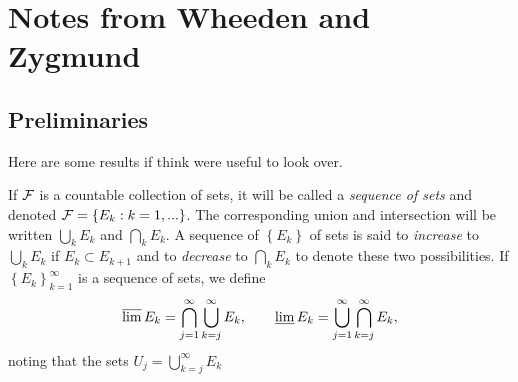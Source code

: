 \chapter{Notes from Wheeden and Zygmund}
\section{Preliminaries}
Here are some results if think were useful to look over.

If $\mathcal{F}$ is a countable collection of sets, it will be called a
\emph{sequence of sets} and denoted $\mathcal{F}=\left\{E_k:k=1,...\right\}$. The
corresponding union and intersection will be written $\bigcup_k E_k$ and
$\bigcap_k E_k$. A sequence of $\left\{E_k\right\}$ of sets is said to
\emph{increase} to $\bigcup_k E_k$ if $E_k\subset E_{k+1}$ and to
\emph{decrease} to $\bigcap_k E_k$ to denote these two possibilities. If
$\left\{E_k\right\}_{k=1}^\infty$ is a sequence of sets, we define
\begin{equation}
  \label{eq:liminf-limsup-sets}
\varlimsup E_k=\bigcap_{j=1}^\infty\bigcup_{k=j}^\infty E_k,\qquad
\varliminf E_k=\bigcup_{j=1}^\infty\bigcap_{k=j}^\infty E_k,
\end{equation}
noting that the sets $U_j=\bigcup_{k=j}^\infty E_k$

